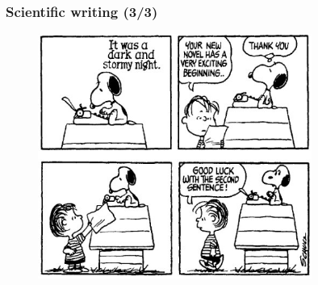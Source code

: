 \documentclass{beamer}
\begin{document}
\begin{frame}
\frametitle{Scientific writing (3/3)}
\begin{figure}[t]
 \includegraphics[width=0.8\textwidth]{images/snoopy.jpeg}
\end{figure}
\end{frame}
\end{document}

